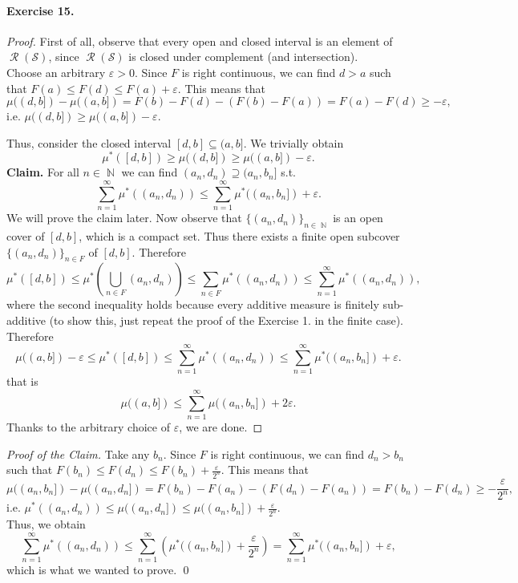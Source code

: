 \documentclass[12pt,a4paper]{report}
\theoremstyle{definition}
\theoremstyle{num.custom-title}
\DeclareMathOperator{\RR}{\mathcal{R}}
\DeclareMathOperator{\N}{\mathbb{N}}
\DeclareMathOperator{\sse}{\subseteq}
\renewcommand{\S}{\mathcal{S}}
\renewcommand{\1}{\mathbbm{1}}
\renewcommand{\epsilon}{\varepsilon}
\begin{document}
\paragraph{Exercise 15.}
\begin{proof}
First of all, observe that every open and closed interval is an element of $\RR(\S)$, since $\RR(\S)$ is closed under complement (and intersection).\\
Choose an arbitrary $\epsilon>0$. Since $F$ is right continuous, we can find $d>a$ such that $F(a) \leq F(d) \leq F(a) + \epsilon$. This means that 
\[
\mu((d,b])-\mu((a,b])=F(b)-F(d)-(F(b)-F(a))=F(a)-F(d) \geq - \epsilon,
\]
i.e. $\mu((d,b]) \geq \mu((a,b])- \epsilon$.

Thus, consider the closed interval $[d,b] \sse (a,b]$. We trivially obtain
\[
\mu^*([d,b]) \geq \mu((d,b]) \geq \mu((a,b]) - \epsilon.
\]
\textbf{Claim.} For all $n \in \N$ we can find $(a_n,d_n) \supseteq (a_n,b_n]$ s.t.
\[
\sum_{n=1}^\infty \mu^*((a_n,d_n)) \leq \sum_{n=1}^\infty \mu^*((a_n,b_n])+\epsilon.
\]
We will prove the claim later. Now observe that $\{(a_n,d_n)\}_{n \in \N}$ is an open cover of $[d,b]$, which is a compact set. Thus there exists a finite open subcover $\{(a_n,d_n)\}_{n \in F}$ of $[d,b]$. Therefore
\[
\mu^*([d,b]) \leq \mu^* \left( \bigcup_{n \in F} (a_n,d_n) \right) \leq \sum_{n \in F} \mu^*((a_n,d_n)) \leq \sum_{n=1}^\infty \mu^*((a_n,d_n)),
\]
where the second inequality holds because every additive measure is finitely sub-additive (to show this, just repeat the proof of the Exercise 1. in the finite case). Therefore
\[
\mu((a,b]) - \epsilon \leq \mu^*([d,b]) \leq \sum_{n=1}^\infty \mu^*((a_n,d_n)) \leq \sum_{n=1}^\infty \mu^*((a_n,b_n])+\epsilon.
\]
that is
\[
\mu((a,b]) \leq \sum_{n=1}^\infty \mu((a_n,b_n])+2\epsilon.
\]
Thanks to the arbitrary choice of $\epsilon$, we are done.
\end{proof}
\noindent\emph{Proof of the Claim.} Take any $b_n$. Since $F$ is right continuous, we can find $d_n > b_n$ such that $F(b_n) \leq F(d_n) \leq F(b_n) + \frac{\epsilon}{2^n}$. This means that
\[
\mu((a_n,b_n])-\mu((a_n,d_n])=F(b_n)-F(a_n)-(F(d_n)-F(a_n))=F(b_n)-F(d_n) \geq - \frac{\epsilon}{2^n},
\]
i.e. $\mu^*((a_n,d_n)) \leq \mu((a_n,d_n]) \leq \mu((a_n,b_n])+ \frac{\epsilon}{2^n}$.\\
Thus, we obtain
\[
\sum_{n=1}^\infty \mu^*((a_n,d_n)) \leq \sum_{n=1}^\infty \left( \mu^*((a_n,b_n])+\frac{\epsilon}{2^n} \right) = \sum_{n=1}^\infty \mu^*((a_n,b_n])+\epsilon,
\]
which is what we wanted to prove. \qed
\end{document}
